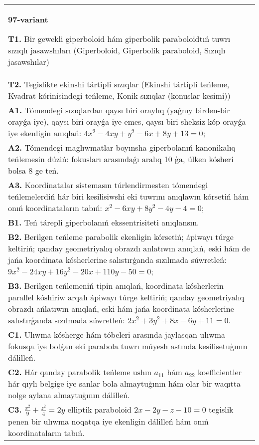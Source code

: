 \documentclass{article}
\begin{document}
\begin{tabular}{m{17cm}}
\textbf{97-variant}
\newline

\textbf{T1.} Bir gewekli giperboloid hám giperbolik paraboloidtıń tuwrı sızıqlı jasawshıları (Giperboloid, Giperbolik paraboloid, Sızıqlı jasawshılar) \\
\textbf{T2.} Tegislikte ekinshi tártipli sızıqlar (Ekinshi tártipli teńleme, Kvadrat kórinisindegi teńleme, Konik sızıqlar (konuslar kesimi)) \\
\textbf{A1.} Tómendegi sızıqlardan qaysı biri oraylıq (yaǵnıy birden-bir orayǵa iye), qaysı biri orayǵa iye emes, qaysı biri sheksiz kóp orayǵa iye ekenligin anıqlań: $4 x^2-4 x y+y^2-6 x+8 y+13=0$; \\
\textbf{A2.} Tómendegi maglıwmatlar boyınsha giperbolanıń kanonikalıq teńlemesin dúziń: fokusları arasındaǵı aralıq 10 ģa, úlken kósheri bolsa 8 ge teń. \\
\textbf{A3.} Koordinatalar sistemasın túrlendirmesten tómendegi teńlemelerdiń hár biri kesilisiwshi eki tuwrını anıqlawın kórsetiń hám onıń koordinataların tabıń: $x^2-6 x y+8 y^2-4 y-4=0$; \\
\textbf{B1.} Teń tárepli giperbolanıń ekssentrisiteti anıqlansın. \\
\textbf{B2.} Berilgen teńleme parabolik ekenligin kórsetiń; ápiwayı túrge keltiriń; qanday geometriyalıq obrazdı anlatıwın anıqlań, eski hám de jańa koordinata kósherlerine salıstırģanda sızılmada súwretleń:$9 x^2-24 x y+16 y^2-20 x+110 y-50=0$; \\
\textbf{B3.} Berilgen teńlemeniń tipin anıqlań, koordinata kósherlerin parallel kóshiriw arqalı ápiwayı túrge keltiriń; qanday geometriyalıq obrazdı ańlatıwın anıqlań, eski hám jańa koordinata kósherlerine salıstırģanda sızılmada súwretleń: $2 x^2+3 y^2+8 x-6 y+11=0$. \\
\textbf{C1.} Ulıwma kósherge hám tóbeleri arasında jaylasqan ulıwma fokusqa iye bolǵan eki parabola tuwrı múyesh astında kesilisetuģının dálilleń. \\
\textbf{C2.} Hár qanday parabolik teńleme ushın $a_{11}$ hám $a_{22}$ koefficientler hár qıylı belgige iye sanlar bola almaytuģının hám olar bir waqıtta nolge aylana almaytuģının dálilleń. \\
\textbf{C3.} $\frac{x^2}{9}+\frac{z^2}{4}=2 y$ elliptik paraboloid $2 x-2 y-z-10=0$ tegislik penen bir ulıwma noqatqa iye ekenligin dálilleń hám onıń koordinataların tabıń. \\

\end{tabular}
\vspace{1cm}
\end{document}
